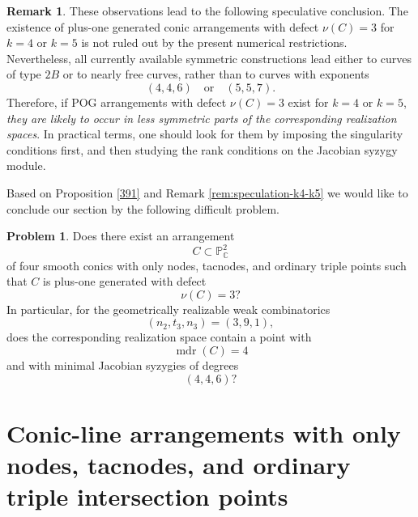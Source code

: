 \documentclass[11pt]{article}
\theoremstyle{plain}
\theoremstyle{definition}
\newtheorem{remark}[thm]{Remark}
\newtheorem{problem}[thm]{Problem}
\begin{document}
\begin{remark}
These observations lead to the following speculative conclusion. The
existence of plus-one generated conic arrangements with defect \(\nu(C)=3\)
for \(k=4\) or \(k=5\) is not ruled out by the present numerical restrictions.
Nevertheless, all currently available symmetric constructions lead either to
curves of type \(2B\) or to nearly free curves, rather than to curves with
exponents
\[
(4,4,6)
\quad\text{or}\quad
(5,5,7).
\]
Therefore, if POG arrangements with defect \(\nu(C)=3\) exist for \(k=4\) or \(k=5\),
\textit{they are likely to occur in less symmetric parts of the corresponding
realization spaces}. In practical terms, one should look for them by imposing
the singularity conditions first, and then studying the rank conditions on the
Jacobian syzygy module.
\end{remark}

Based on Proposition \ref{391} and Remark \ref{rem:speculation-k4-k5} we would like to conclude our section by the following difficult problem.
\begin{problem}
Does there exist an arrangement
\[
C\subset \mathbb P^2_{\mathbb C}
\]
of four smooth conics with only nodes, tacnodes, and ordinary triple points such that \(C\) is plus-one generated with defect
\[
\nu(C)=3?
\]
In particular, for the geometrically realizable weak combinatorics
\[
(n_2,t_3,n_3)=(3,9,1),
\]
does the corresponding realization space contain a point with
\[
\operatorname{mdr}(C)=4
\]
and with minimal Jacobian syzygies of degrees
\[
(4,4,6)?\]
\end{problem}

\section{Conic-line arrangements with only nodes, tacnodes, and ordinary triple intersection points} \label{sec:CL}
\end{document}
